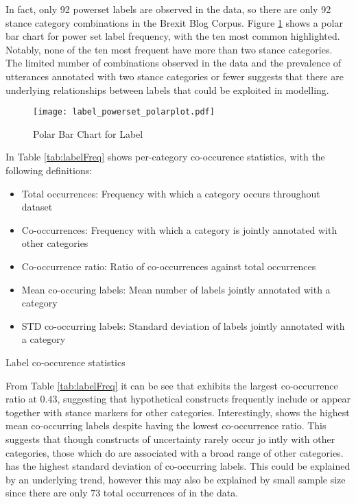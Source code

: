 \documentclass[Dissertation.tex]{subfiles}
\begin{document}
In fact, only 92 powerset labels are observed in the data, so there are only 92 stance category combinations in the Brexit Blog Corpus. Figure \ref{fig:polarBarChart} shows a polar bar chart for power set label frequency, with the ten most common highlighted. Notably, none of the ten most frequent have more than two stance categories. The limited number of combinations observed in the data and the prevalence of utterances annotated with two stance categories or fewer suggests that there are underlying relationships between labels that could be exploited in modelling.
\begin{figure}
	\centering
	
	\texttt{[image: label\_powerset\_polarplot.pdf]}
	\caption{Polar Bar Chart for Label}
	\label{fig:polarBarChart}
\end{figure}


In Table \ref{tab:labelFreq} shows per-category co-occurence statistics, with the following definitions: \begin{itemize}
	\item Total occurrences: Frequency with which a category occurs throughout dataset
	\item Co-occurrences: Frequency with which a category is jointly annotated with other categories
	
	\item Co-occurrence ratio: Ratio of co-occurrences against total occurrences
	\item Mean co-occuring labels: Mean number of labels jointly annotated with a category
	\item  STD co-occurring labels: Standard deviation of labels jointly annotated with a category
\end{itemize}

\begin{table}
	\caption{Label co-occurence statistics}
	\label{tab:labelFreq}
	
	
\end{table}

From Table \ref{tab:labelFreq} it can be see that  exhibits the largest co-occurrence ratio at $ 0.43 $, suggesting that hypothetical constructs frequently include or appear together with stance markers for other categories. Interestingly,  shows the highest mean co-occurring labels despite having the lowest co-occurrence ratio. This suggests that though constructs of uncertainty rarely occur jo	intly with other categories, those which do are associated with a broad range of other categories.  has the highest standard deviation of co-occurring labels. This could be explained by an underlying trend, however this may also be explained by small sample size since there are only $ 73 $ total occurrences of  in the data.
\end{document}

